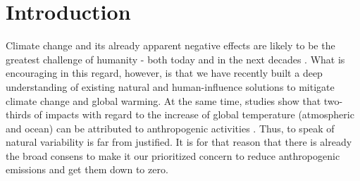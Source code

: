 \section{Introduction}
Climate change and its already apparent negative effects are likely to be the greatest challenge of humanity - both today and in the next decades \cite{karl2003modern}. What is encouraging in this regard, however, is that we have recently built a deep understanding of existing natural \cite{griscom2017natural} and human-influence solutions to mitigate climate change and global warming. At the same time, studies show that two-thirds of impacts with regard to the increase of global temperature (atmospheric and ocean) can be attributed to anthropogenic activities \cite{hansen2016assessing}. Thus, to speak of natural variability is far from justified. It is for that reason that there is already the broad consens to make it our prioritized concern to reduce anthropogenic emissions and get them down to zero.\newline

